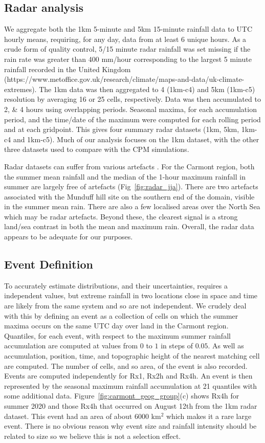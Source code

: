 \documentclass[11pt,a4paper]{article}
\begin{document}
\subsection{Radar analysis}
We aggregate both the  1km 5-minute and 5km 15-minute rainfall data to UTC hourly means, requiring, for any day, data from at least 6  unique hours. As a crude form of quality control, 5/15 minute radar rainfall was set missing if the rain rate was greater than 400 mm/hour corresponding to the largest 5 minute rainfall recorded in the United Kingdom (https://www.metoffice.gov.uk/research/climate/maps-and-data/uk-climate-extremes).  The 1km data was then aggregated to 4 (1km-c4) and 5km (1km-c5) resolution by averaging 16 or 25 cells, respectively. Data was then accumulated to 2, \&  4 hours using overlapping periods. Seasonal maxima, for each accumulation period,  and the time/date of the  maximum were computed for each rolling period and at each gridpoint. This gives four summary radar datasets (1km, 5km,  1km-c4 and  1km-c5). Much of our analysis focuses on the 1km dataset, with the  other three datasets used to compare with the CPM simulations. 

Radar datasets can suffer from various artefacts \parencite{Overeem2023euradclim}.
For the Carmont region, both the summer mean rainfall and the median of the 1-hour maximum rainfall in summer are largely free of artefacts (Fig~\ref{fig:radar_jja}). There are two artefacts associated with the Munduff hill site on the southern end of the domain, visible in the summer mean rain. There are also a few localised areas over the North Sea which may be radar artefacts.  Beyond these, the clearest signal is a strong land/sea contrast in both the mean and maximum rain. Overall, the radar data appears to be adequate for our purposes.  

\subsection{Event Definition}


To accurately estimate distributions, and their uncertainties,  requires a independent values, but extreme rainfall in two locations close in space and time are likely from the same  system and so are not independent.  We crudely deal with this by defining an event  as a collection of cells on which the summer maxima  occurs on the same UTC day over land in the Carmont region.   Quantiles, for each event, with respect to the maximum summer rainfall accumulation are computed at values from $0$ to $1$ in steps of $0.05$. As well as  accumulation,  position, time, and topographic height of the nearest matching cell are computed. The  number of cells, and so area, of the event is also recorded.  Events are computed independently for Rx1, Rx2h and Rx4h. An event is then represented by the seasonal maximum rainfall accumulation at 21  quantiles  with some additional data. Figure~\ref{fig:carmont_geog_group}(c) shows Rx4h  for summer 2020 and  those Rx4h  that occurred on  August 12th  from the 1km radar dataset. This event had an area of about 6000 km$^2$ which makes it a rare large event. There is no obvious  reason why event size and rainfall intensity should be related to size so we believe this is not a selection effect.
\end{document}
